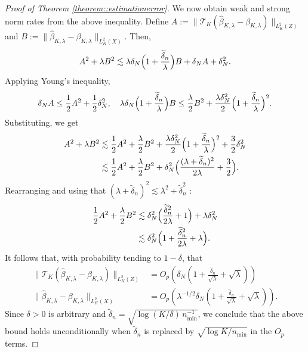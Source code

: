 \documentclass[11pt]{article}
\theoremstyle{plain}
\theoremstyle{definition}
\theoremstyle{remark}
\theoremstyle{definition}
\begin{document}
\begin{proof}[Proof of Theorem \ref{theorem::estimationerror}]
We now obtain weak and strong norm rates from the above inequality. Define $A := \|\mathcal{T}_{K}(\widehat{\beta}_{K,\lambda}-\beta_{K,\lambda})\|_{L^2_K(Z)}$ and $B := \|\widehat{\beta}_{K,\lambda}-\beta_{K,\lambda}\|_{L^2_K(X)}.$ Then, 
\[
A^2 + \lambda B^2 \lesssim \lambda\delta_N\Bigl(1+\frac{\widetilde{\delta}_n}{\lambda}\Bigr)B + \delta_N A + \delta_N^2.
\]
Applying Young’s inequality,
\[
\delta_N A \le \frac{1}{2}A^2 + \frac{1}{2}\delta_N^2, \quad
\lambda\delta_N\Bigl(1+\frac{\widetilde{\delta}_n}{\lambda}\Bigr)B \le \frac{\lambda}{2}B^2 + \frac{\lambda\delta_N^2}{2}\Bigl(1+\frac{\widetilde{\delta}_n}{\lambda}\Bigr)^2.
\]
Substituting, we get
\begin{align*}
    A^2 + \lambda B^2 &\lesssim \frac{1}{2}A^2 + \frac{\lambda}{2}B^2 
+ \frac{\lambda\delta_N^2}{2}\Bigl(1+\frac{\widetilde{\delta}_n}{\lambda}\Bigr)^2 + \frac{3}{2}\delta_N^2\\
& \lesssim \frac{1}{2} A^2 + \frac{\lambda}{2} B^2 + \delta_N^2 \Bigl(\frac{(\lambda+\widetilde{\delta}_n)^2}{2\lambda} + \frac{3}{2}\Bigr).
\end{align*}
Rearranging and using that $(\lambda+\widetilde{\delta}_n)^2 \lesssim \lambda^2 + \widetilde{\delta}_n^2$ :
\begin{align*}
    \frac{1}{2} A^2 + \frac{\lambda}{2} B^2 & \lesssim \delta_N^2 \Bigl(\frac{\widetilde{\delta}_n^2}{2\lambda} + 1\Bigr) +  \lambda \delta_N^2\\
     & \lesssim  \delta_N^2 \Bigl(1 + \frac{\widetilde{\delta}_n^2}{2\lambda} + \lambda\Bigr).
\end{align*}
It follows that, with probability tending to $1 - \delta$, that
\begin{align*}
\|\mathcal{T}_{K}(\widehat{\beta}_{K,\lambda}-\beta_{K,\lambda})\|_{L^2_K(Z)}& = O_p\left(\delta_N \left( 1 + \frac{\widetilde{\delta}_n}{\sqrt{\lambda}}  + \sqrt{\lambda} \right) \right)\\
\|\widehat{\beta}_{K,\lambda}-\beta_{K,\lambda}\|_{L^2_K(X)} &= O_p\left(\lambda^{-1/2} \delta_N \left( 1 + \frac{\widetilde{\delta}_n}{\sqrt{\lambda}}  + \sqrt{\lambda} \right)\right).
\end{align*} 
Since \(\delta > 0\) is arbitrary and \(\widetilde{\delta}_n = \sqrt{\log(K/\delta)\,n_{\min}^{-1}}\), we conclude that the above bound holds unconditionally when \(\widetilde{\delta}_n\) is replaced by \(\sqrt{\log K / n_{\min}}\) in the \(O_p\) terms.



 




 \end{proof}
 
\end{document}
